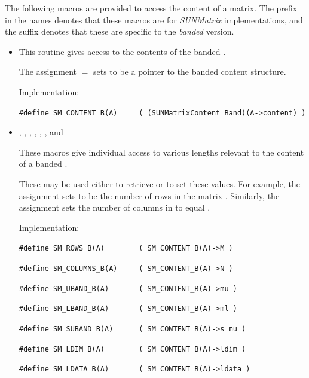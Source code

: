 \noindent The following macros are provided to access the
content of a {\sunmatband} matrix. The prefix  in the names
denotes that these macros are for \emph{SUNMatrix} implementations,
and the suffix  denotes that these are specific to
the \emph{banded} version.
\begin{itemize}

\item {}
    
  This routine gives access to the contents of the
  banded .
  
  The assignment  $=$  sets           
   to be a pointer to the banded  content  
  structure.                                             
                                                            
  Implementation: 
  
  \verb|#define SM_CONTENT_B(A)     ( (SUNMatrixContent_Band)(A->content) )|
  
\item {}, , , , , , and 

  These macros give individual access to various lengths relevant to the
  content of a banded .                        
                                                               
  These may be used either to retrieve or to set these values.  For
  example, the assignment  sets  to be
  the number of rows in the matrix .  Similarly, the
  assignment  sets the number of
  columns in  to equal .
  
  Implementation: 
  
  \verb|#define SM_ROWS_B(A)        ( SM_CONTENT_B(A)->M )|

  \verb|#define SM_COLUMNS_B(A)     ( SM_CONTENT_B(A)->N )|

  \verb|#define SM_UBAND_B(A)       ( SM_CONTENT_B(A)->mu )|

  \verb|#define SM_LBAND_B(A)       ( SM_CONTENT_B(A)->ml )|

  \verb|#define SM_SUBAND_B(A)      ( SM_CONTENT_B(A)->s_mu )|

  \verb|#define SM_LDIM_B(A)        ( SM_CONTENT_B(A)->ldim )|

  \verb|#define SM_LDATA_B(A)       ( SM_CONTENT_B(A)->ldata )|


\end{itemize}
